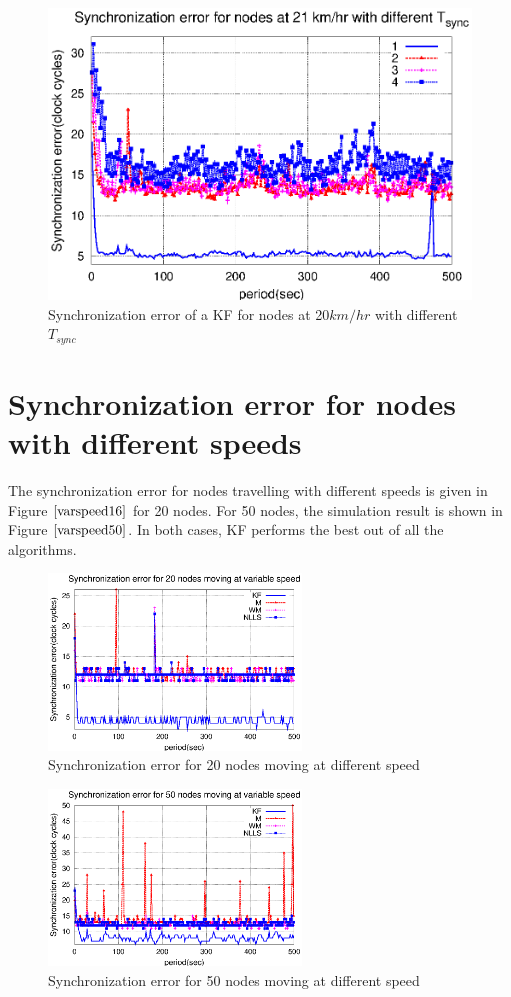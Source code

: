 \documentclass[a4paper,10pt]{report}
\begin{document}
\begin{figure}[!h]
\centering
\includegraphics[width= 0.7 \textwidth]{tsync20}
\caption{Synchronization error of a KF for nodes at 20$km/hr$ with different $T_{sync}$} \label{tsync20}
\end{figure}
\section{\textbf{Synchronization error for nodes with different speeds}}
The synchronization error for nodes travelling with different speeds is given in Figure $\ref{varspeed16}$ for 20 nodes. For 50 nodes, the simulation result is shown in Figure $\ref{varspeed50}$. In both cases, KF performs the best out of all the algorithms.
\begin{figure}
 \centering
 \includegraphics[width=0.6\textwidth]{varspeed20}
 \caption{Synchronization error for 20 nodes moving at different speed}
 \label{varspeed16}
\end{figure}
\begin{figure}
 \centering
 \includegraphics[width=0.6\textwidth]{varspeed50}
 \caption{Synchronization error for 50 nodes moving at different speed}
 \label{varspeed50}
\end{figure}
\end{document}
